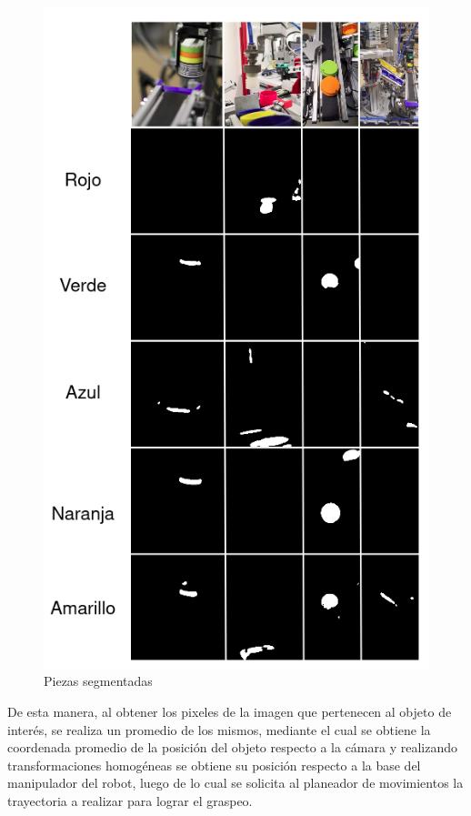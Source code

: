 \begin{figure}[ht]
    \centering
    \includegraphics[scale=0.4]{Figures/AllSegmented_AllPieces_Names.png}
        \caption{Piezas segmentadas}
        \label{fig:All_Segmented_AllPieces}
\end{figure}

De esta manera, al obtener los pixeles de la imagen que pertenecen al objeto de interés, se realiza un promedio de los mismos, mediante el cual se obtiene la coordenada promedio de la posición del objeto respecto a la cámara y realizando transformaciones homogéneas se obtiene su posición respecto a la base del manipulador del robot, luego de lo cual se solicita al planeador de movimientos la trayectoria a realizar para lograr el graspeo.

